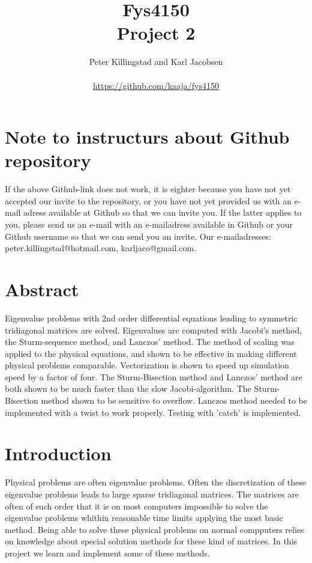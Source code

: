\documentclass{article}
\title{Fys4150\\Project 2\\ }
\author{Peter Killingstad and Karl Jacobsen\\
\\
\url{https://github.com/kaaja/fys4150}}
\begin{document}
	
\maketitle

\section*{Note to instructurs about Github repository}
If the above Github-link does not work, it is eighter because you have not yet accepted our invite to the repository, or you have not yet provided us with an e-mail adress available at Github so that we can invite you. If the latter applies to you, please send us an e-mail with an e-mailadress available in Github or your Github username so that we can send you an invite. Our e-mailadresses: peter.killingstad@hotmail.com, karljaco@gmail.com.

\section*{Abstract}
Eigenvalue problems with 2nd order differential equations leading to symmetric tridiagonal matrices are solved. Eigenvalues are computed with Jacobi's method, the Sturm-sequence method, and Lanczos' method. The method of scaling was applied to the physical equations, and shown to be effective in making different physical problems comparable.  Vectorization is shown to speed up simulation speed by a factor of four. The Sturm-Bisection method and Lanczos' method are both shown to be much faster than the slow Jacobi-algorithm. The Sturm-Bisection method shown to be sensitive to overflow. Lanczos method needed to be implemented with a twist to work properly. Testing with 'catch' is implemented.

\section{Introduction}
Physical problems are often eigenvalue problems. Often the discretization of these eigenvalue problems leads to large sparse tridiagonal matrices. The matrices are often of such order that it is on most computers impossible to solve the eigenvalue problems whithin reasonable time limits applying the most basic method. Being able to solve these physical problems on normal compputers relies on knowledge about special solution methods for these kind of matrices. In this project we learn and implement some of these methods.\\
\end{document}

